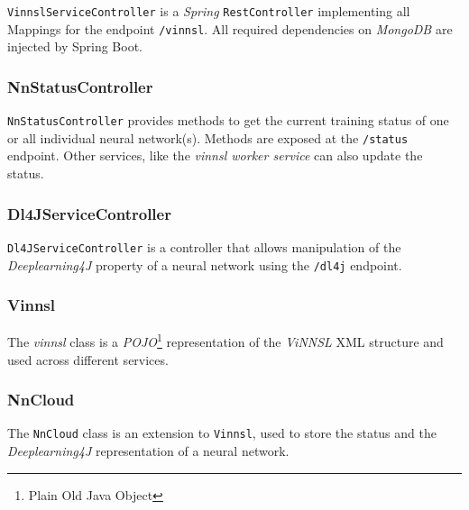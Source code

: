 \texttt{VinnslServiceController} is a \emph{Spring}
\texttt{RestController} implementing all Mappings for the endpoint
\texttt{/vinnsl}. All required dependencies on \emph{MongoDB} are
injected by Spring Boot.

\subsubsection{NnStatusController}\label{nnstatuscontroller}

\texttt{NnStatusController} provides methods to get the current training
status of one or all individual neural network(s). Methods are exposed
at the \texttt{/status} endpoint. Other services, like the \emph{vinnsl
worker service} can also update the status.

\subsubsection{Dl4JServiceController}\label{dl4jservicecontroller}

\texttt{Dl4JServiceController} is a controller that allows manipulation
of the \emph{Deeplearning4J} property of a neural network using the
\texttt{/dl4j} endpoint.

\subsubsection{Vinnsl}\label{vinnsl-1}

The \emph{vinnsl} class is a \emph{POJO}\footnote{Plain Old Java Object}
representation of the \emph{ViNNSL} XML structure and used across
different services.

\subsubsection{NnCloud}\label{nncloud}

The \texttt{NnCloud} class is an extension to \texttt{Vinnsl}, used to
store the status and the \emph{Deeplearning4J} representation of a
neural network.

